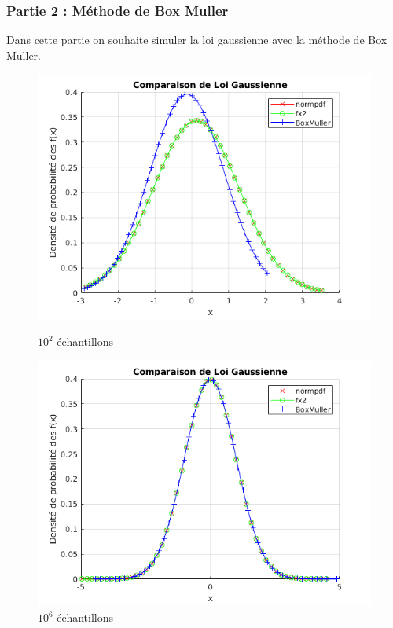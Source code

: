 \documentclass[a4paper,oneside]{article}
\begin{document}
\newpage
\subsubsection{Partie 2 : Méthode de Box Muller}
Dans cette partie on souhaite simuler la loi gaussienne avec la méthode de Box Muller.

\begin{figure}[h]
\centering
    \begin{minipage}[c]{.46\linewidth}
        \centering
        \includegraphics[scale=0.5]{../Exercice2/BMN=100.png}
        \caption{$10^2$ échantillons}
    \end{minipage}
    \hfill%
    \begin{minipage}[c]{.46\linewidth}
        \centering
        \includegraphics[scale=0.5]{../Exercice2/BMN=1E6.png}
        \caption{$10^6$ échantillons}
    \end{minipage}
\end{figure}
 
\end{document}
